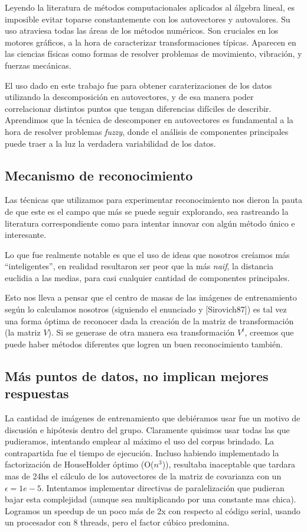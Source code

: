 Leyendo la literatura de m\'etodos computacionales aplicados al \'algebra lineal, es
imposible evitar toparse constantemente con los autovectores y autovalores. Su
uso atraviesa todas las \'areas de los m\'etodos num\'ericos. Son cruciales
en los motores gr\'aficos, a la hora de caracterizar transformaciones t\'ipicas.
Aparecen en las ciencias f\'isicas como formas de resolver problemas de movimiento,
vibraci\'on, y fuerzas mec\'anicas.

El uso dado en este trabajo fue para obtener caraterizaciones de los datos utilizando la
descomposici\'on en autovectores, y de esa manera poder correlacionar distintos puntos que
tengan diferencias dif\'iciles de describir. Aprendimos que la t\'ecnica de descomponer en autovectores
es fundamental a la hora de resolver problemas \textit{fuzzy}, donde
el an\'alisis de componentes principales puede traer a la luz la verdadera variabilidad de los datos.


\subsection{Mecanismo de reconocimiento}

Las t\'ecnicas que utilizamos para experimentar reconocimiento nos dieron
la pauta de que este es el campo que m\'as se puede seguir explorando, sea rastreando la literatura
correspondiente como para intentar innovar con alg\'un m\'etodo \'unico e interesante.

Lo que fue realmente notable es que el uso de ideas que nosotros cre\'iamos m\'as ``inteligentes'',
en realidad resultaron ser peor que la m\'as \textit{naif}, la distancia euclidia a las medias, para
casi cualquier cantidad de componentes principales.

Esto nos lleva a pensar que el centro de masas de las im\'agenes de entrenamiento seg\'un lo calculamos
nosotros (siguiendo el enunciado y [Sirovich87]) es tal vez una forma \'optima de reconocer
dada la creaci\'on de la matriz de transformaci\'on (la matriz $V$). Si se generase de otra manera esa
transformaci\'on $V^t$, creemos que puede haber m\'etodos diferentes que logren un buen reconocimiento tambi\'en.


\subsection{M\'as puntos de datos, no implican mejores respuestas}

La cantidad de im\'agenes de entrenamiento que debi\'eramos usar fue un motivo de
discusi\'on e hip\'otesis dentro del grupo.
Claramente quisimos usar todas las que pudieramos, intentando emplear al m\'aximo el
uso del corpus brindado. La contrapartida fue el tiempo de ejecuci\'on. Incluso habiendo implementado
la factorizaci\'on de HouseHolder \'optimo (O($n^3$)), resultaba inaceptable que tardara mas de 24hs
el c\'alculo de los autovectores de la matriz de covarianza con un $\epsilon = 1e-5$. Intentamos implementar
directivas de paralelizaci\'on que pudieran bajar esta complejidad (aunque sea multiplicando por una
constante mas chica). Logramos un speedup de un poco m\'as de 2x con respecto al c\'odigo serial, usando
un procesador con 8 threads, pero el factor c\'ubico predomina.


